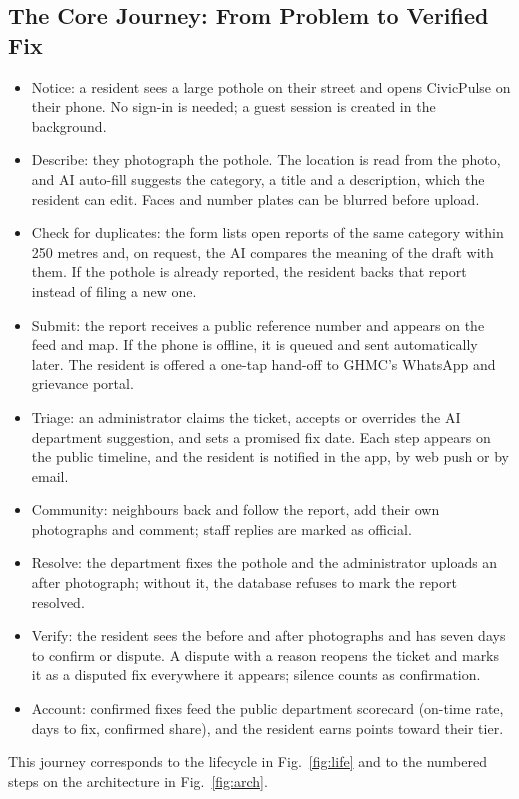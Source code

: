 \documentclass[conference]{IEEEtran}
\begin{document}
\subsection{The Core Journey: From Problem to Verified Fix}
\begin{itemize}
\item Notice: a resident sees a large pothole on their street and opens CivicPulse on their phone. No sign-in is needed; a guest session is created in the background.
\item Describe: they photograph the pothole. The location is read from the photo, and AI auto-fill suggests the category, a title and a description, which the resident can edit. Faces and number plates can be blurred before upload.
\item Check for duplicates: the form lists open reports of the same category within 250 metres and, on request, the AI compares the meaning of the draft with them. If the pothole is already reported, the resident backs that report instead of filing a new one.
\item Submit: the report receives a public reference number and appears on the feed and map. If the phone is offline, it is queued and sent automatically later. The resident is offered a one-tap hand-off to GHMC's WhatsApp and grievance portal.
\item Triage: an administrator claims the ticket, accepts or overrides the AI department suggestion, and sets a promised fix date. Each step appears on the public timeline, and the resident is notified in the app, by web push or by email.
\item Community: neighbours back and follow the report, add their own photographs and comment; staff replies are marked as official.
\item Resolve: the department fixes the pothole and the administrator uploads an after photograph; without it, the database refuses to mark the report resolved.
\item Verify: the resident sees the before and after photographs and has seven days to confirm or dispute. A dispute with a reason reopens the ticket and marks it as a disputed fix everywhere it appears; silence counts as confirmation.
\item Account: confirmed fixes feed the public department scorecard (on-time rate, days to fix, confirmed share), and the resident earns points toward their tier.
\end{itemize}
This journey corresponds to the lifecycle in Fig.~\ref{fig:life} and to the numbered steps on the architecture in Fig.~\ref{fig:arch}.
\end{document}
